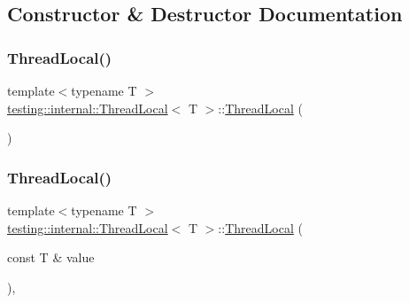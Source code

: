\subsection{Constructor \& Destructor Documentation}
\mbox{\label{classtesting_1_1internal_1_1_thread_local_a106f3a3ad15d08f95f9887105d2a1af5}} 
\subsubsection{\texorpdfstring{ThreadLocal()}{ThreadLocal()}\hspace{0.1cm}{\footnotesize\ttfamily [1/6]}}
{\footnotesize\ttfamily template$<$typename T $>$ \\
\mbox{\hyperlink{classtesting_1_1internal_1_1_thread_local}{testing\+::internal\+::\+Thread\+Local}}$<$ T $>$\+::\mbox{\hyperlink{classtesting_1_1internal_1_1_thread_local}{Thread\+Local}} (\begin{DoxyParamCaption}{ }\end{DoxyParamCaption})\hspace{0.3cm}{\ttfamily [inline]}}

\mbox{\label{classtesting_1_1internal_1_1_thread_local_a85610bdfdbc93a4c56215e0aad7da870}} 
\subsubsection{\texorpdfstring{ThreadLocal()}{ThreadLocal()}\hspace{0.1cm}{\footnotesize\ttfamily [2/6]}}
{\footnotesize\ttfamily template$<$typename T $>$ \\
\mbox{\hyperlink{classtesting_1_1internal_1_1_thread_local}{testing\+::internal\+::\+Thread\+Local}}$<$ T $>$\+::\mbox{\hyperlink{classtesting_1_1internal_1_1_thread_local}{Thread\+Local}} (\begin{DoxyParamCaption}\item[{const T \&}]{value }\end{DoxyParamCaption})\hspace{0.3cm}{\ttfamily [inline]}, {\ttfamily [explicit]}}

